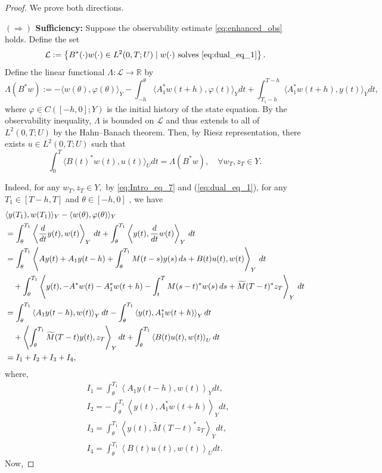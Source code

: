 \documentclass[12pt]{article}
\theoremstyle{plain}
\theoremstyle{definition}
\begin{document}
\begin{proof}
We prove both directions.

\textbf{$(\Rightarrow)$ Sufficiency:} Suppose the observability estimate \eqref{eq:enhanced_obs} holds. Define the set
\[
\mathcal{L} := \left\{ B^*(\cdot)w(\cdot) \in L^2(0, T; U) \mid w(\cdot) \text{ solves } \eqref{eq:dual_eq_1} \right\}.
\]
Define the linear functional $\Lambda : \mathcal{L} \to \mathbb{R}$ by
\[
\Lambda(B^*w) := -\langle w(\theta), \varphi(\theta) \rangle_Y - \int_{- h}^{\theta} \langle A_1^*w(t+h), \varphi(t) \rangle_Y dt + \int_{T_1 - h}^{T-h} \langle A_1^* w(t+h), y(t) \rangle_Y dt,
\]
where $\varphi \in C([-h, 0]; Y)$ is the initial history of the state equation. By the observability inequality, $\Lambda$ is bounded on $\mathcal{L}$ and thus extends to all of $L^2(0, T; U)$ by the Hahn--Banach theorem. Then, by Riesz representation, there exists $u \in L^2(0, T; U)$ such that
\begin{equation}\label{eq:eq_Obs_ineq_3}
    \int_0^T \langle B(t)^* w(t), u(t) \rangle_U dt = \Lambda(B^* w), \quad \forall w_T, z_T \in Y.
\end{equation}


Indeed, for any $w_T,z_T \in Y,$ by \eqref{eq:Intro_eq_7} and (\ref{eq:dual_eq_1}), for any $T_1 \in [T-h,T]$ and $\theta \in [-h,0]$ , we have
\begin{align}\label{eq:eq_Obs_ineq_1}
    &\langle y(T_1), w(T_1) \rangle_Y - \langle w(\theta), \varphi(\theta) \rangle_Y \notag \\
&= \int_{\theta}^{T_1} \left\langle \frac{d}{dt} y(t), w(t) \right\rangle_Y \, dt + \int_{\theta}^{T_1} \left\langle y(t), \frac{d}{dt} w(t) \right\rangle_Y \, dt \notag \\
&= \int_{\theta}^{T_1} \left\langle Ay(t) + A_1y(t-h) + \int_{\theta}^{T_1} M(t-s)y(s)\,ds + B(t)u(t), w(t) \right\rangle_Y \, dt \notag \\
&\quad + \int_{\theta}^{T_1} \left\langle y(t), -A^*w(t) - A_1^*w(t+h) - \int_t^T M(s - t)^*w(s)\,ds + \widetilde{M}(T - t)^*z_T \right\rangle_Y \, dt \notag \\
&= \int_{\theta}^{T_1}\left\langle A_1 y(t-h),w(t)\right\rangle_Y dt -\int_{\theta}^{T_1}\left\langle y(t),A_1^*w(t+h)\right\rangle_Y dt \notag\\
& \quad +\left\langle \int_{\theta}^{T_1}\widetilde{M}(T - t)y(t), z_T  \right\rangle_Y dt + \int_{\theta}^{T_1}\left\langle B(t)u(t),w(t)  \right\rangle_U dt \notag\\
&=I_1 +I_2 +I_3+I_4,
\end{align}
where,
\begin{align*}
    &I_1=\int_{\theta}^{T_1}\left\langle A_1 y(t-h),w(t)\right\rangle_Y dt,\\
   & I_2=  -\int_{\theta}^{T_1}\left\langle y(t),A_1^*w(t+h)\right\rangle_Y dt,\\
   &I_3=\int_{\theta}^{T_1}\left\langle y(t), \widetilde{M}(T - t)^*z_T  \right\rangle_Y dt,\\
   &I_4=\int_{\theta}^{T_1}\left\langle B(t)u(t),w(t)  \right\rangle_U dt.
\end{align*}
Now,


\end{proof}
\end{document}
